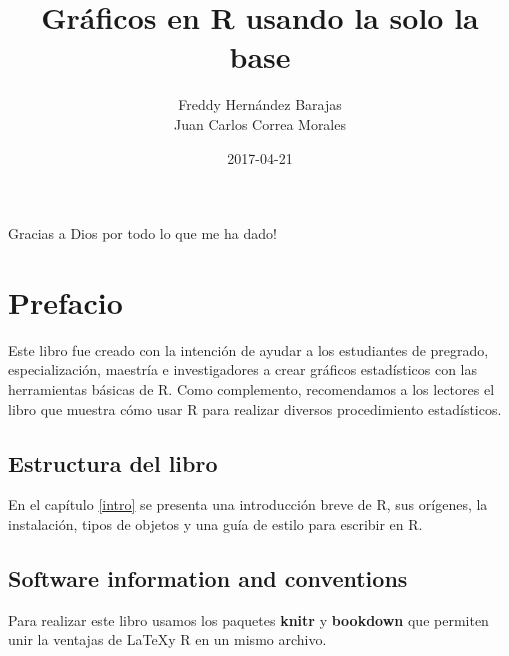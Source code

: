 \documentclass[10pt,]{krantz}
\title{Gráficos en R usando la solo la base}
\author{Freddy Hernández Barajas\\
Juan Carlos Correa Morales}
\date{2017-04-21}
\let\proglang=\textsf
\begin{document}
\maketitle


\thispagestyle{empty}

\begin{center}


Gracias a Dios por todo lo que me ha dado!

\end{center}

\setlength{\abovedisplayskip}{-5pt}
\setlength{\abovedisplayshortskip}{-5pt}

{
\hypersetup{linkcolor=black}
\setcounter{tocdepth}{2}
\tableofcontents
}
\listoftables
\listoffigures
\chapter*{Prefacio}\label{prefacio}


Este libro fue creado con la intención de ayudar a los estudiantes de
pregrado, especialización, maestría e investigadores a crear gráficos
estadísticos con las herramientas básicas de \proglang{R}. Como
complemento, recomendamos a los lectores el libro
\citet{hernandez_usuga} que muestra cómo usar \proglang{R} para realizar
diversos procedimiento estadísticos.

\section*{Estructura del libro}\label{estructura-del-libro}


En el capítulo \ref{intro} se presenta una introducción breve de
\proglang{R}, sus orígenes, la instalación, tipos de objetos y una guía
de estilo para escribir en \proglang{R}.

\section*{Software information and
conventions}\label{software-information-and-conventions}


Para realizar este libro usamos los paquetes \textbf{knitr}
\citep{xie2015} y \textbf{bookdown} \citep{R-bookdown}
que permiten unir la ventajas de \LaTeX y \proglang{R} en un mismo
archivo.
\end{document}
